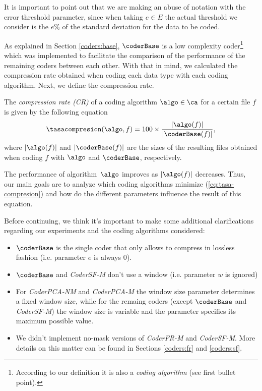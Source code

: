 It is important to point out that we are making an abuse of notation with the error threshold parameter, since when taking $e \in E$ the actual threshold we consider is the $e\%$ of the standard deviation for the data to be coded.
    
\newcommand{\cbits}{\coder_{\textit{S}}}
\newcommand{\basebits}{\textit{Base}_{\textit{S}}}
\newcommand{\footcoderbase}{According to our definition it is also a \textit{coding algorithm} (see first bullet point).}
As explained in Section \ref{coders:base}, $\coderBase$ is a low complexity coder\footnote{\footcoderbase} which was implemented to facilitate the comparison of the performance of the remaining coders between each other. With that in mind, we calculated the compression rate obtained when coding each data type with each coding algorithm. Next, we define the compression rate.

\begin{defcion}
The \textit{compression rate (CR)} of a coding algorithm  $\algo \in \ca$ for a certain file $f$ is given by the following equation
\vspace{-5pt}
\begin{equation}
\label{eq:tasa-compresion}
\tasacompresion(\algo, f) = 100\times\frac{|\algo(f)|}{|\coderBase(f)|},
\end{equation}
where $|\algo(f)|$ and $|\coderBase(f)|$ are the sizes of the resulting files obtained when coding $f$ with $\algo$ and $\coderBase$, respectively.
\end{defcion}

The performance of algorithm~$\algo$ improves as $|\algo(f)|$ decreases. Thus, our main goals are to analyze which coding algorithms minimize (\ref{eq:tasa-compresion}) and how do the different parameters influence the result of this equation.

\vspace{+5pt}
Before continuing, we think it's important to make some additional clarifications regarding our experiments and the coding algorithms considered:

\vspace{-8pt}
\begin{itemize}
    \item $\coderBase$ is the single coder that only allows to compress in lossless fashion (i.e. parameter $e$ is always 0).
    \item $\coderBase$ and \textit{CoderSF-M} don't use a window (i.e. parameter $w$ is ignored) 
    \item For \textit{CoderPCA-NM} and \textit{CoderPCA-M} the window size parameter determines a fixed window size, while for the remaing coders (except $\coderBase$ and \textit{CoderSF-M}) the window size is variable and the parameter specifies its maximum possible value.
    \item We didn't implement no-mask versions of \textit{CoderFR-M} and \textit{CoderSF-M}. More details on this matter can be found in Sections \ref{coders:fr} and \ref{coders:sf}.
\end{itemize}












